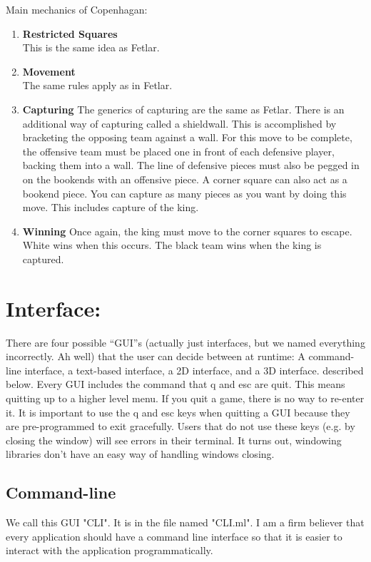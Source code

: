 \documentclass[11pt, oneside]{article}
\begin{document}
Main mechanics of Copenhagan:
\begin{enumerate}
\item \textbf{Restricted Squares}\\
  This is the same idea as Fetlar.
\item \textbf{Movement}\\
  The same rules apply as in Fetlar.
\item \textbf{Capturing}
  The generics of capturing are the same as Fetlar. There is an additional way of capturing called a shieldwall.  This is accomplished by bracketing the opposing team against a wall.  For this move to be complete, the offensive team must be placed one in front of each defensive player, backing them into a wall.  The line of defensive pieces must also be pegged in on the bookends with an offensive piece. A corner square can also act as a bookend piece. You can capture as many pieces as you want by doing this move.  This includes capture of the king.
\item \textbf{Winning}
  Once again, the king must move to the corner squares to escape.  White wins when this occurs.  The black team wins when the king is captured.
\end{enumerate}


\section{Interface:}
There are four possible ``GUI''s (actually just interfaces, but we named
everything incorrectly. Ah well) that the user can decide between at runtime:
A command-line interface, a text-based interface, a 2D interface, and a 3D interface.
described below.  Every GUI includes the command that q and esc are quit.  This
means quitting up to a higher level menu. If you quit a game, there is no way to
re-enter it.  It is important to use the q and esc keys when quitting a GUI
because they are pre-programmed to exit gracefully. Users that do not use these
keys (e.g. by closing the window) will see errors in their terminal. It turns
out, windowing libraries don't have an easy way of handling windows closing.

\subsection{Command-line}
We call this GUI "CLI".  It is in the file named "CLI.ml".
I am a firm believer that every application should have a command line
interface so that it is easier to interact with the application
programmatically.
\end{document}
